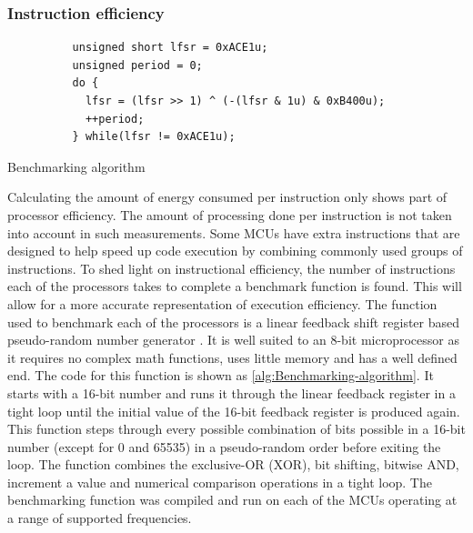     \subsubsection{Instruction efficiency}

      \begin{algorithm}
        \begin{lstlisting}
          unsigned short lfsr = 0xACE1u;
          unsigned period = 0;
          do {
            lfsr = (lfsr >> 1) ^ (-(lfsr & 1u) & 0xB400u);
            ++period;
          } while(lfsr != 0xACE1u);
        \end{lstlisting}
        \caption{\label{alg:Benchmarking-algorithm}Benchmarking algorithm}
      \end{algorithm}

      Calculating the amount of energy consumed per instruction only shows part of processor efficiency.
      The amount of processing done per instruction is not taken into account in such measurements.
      Some MCUs have extra instructions that are designed to help speed up code execution by combining commonly used groups of instructions.
      To shed light on instructional efficiency, the number of instructions each of the processors takes to complete a benchmark function is found.
      This will allow for a more accurate representation of execution efficiency.
      The function used to benchmark each of the processors is a linear feedback shift register based pseudo-random number generator \cite{Wikipedia2015}.
      It is well suited to an 8-bit microprocessor as it requires no complex math functions, uses little memory and has a well defined end.
      The code for this function is shown as \cref{alg:Benchmarking-algorithm}.
      It starts with a 16-bit number and runs it through the linear feedback register in a tight loop until the initial value of the 16-bit feedback register is produced again.
      This function steps through every possible combination of bits possible in a 16-bit number (except for 0 and 65535) in a pseudo-random order before exiting the loop.
      The function combines the exclusive-OR (XOR), bit shifting, bitwise AND, increment a value and numerical comparison operations in a tight loop.
      The benchmarking function was compiled and run on each of the MCUs operating at a range of supported frequencies.

